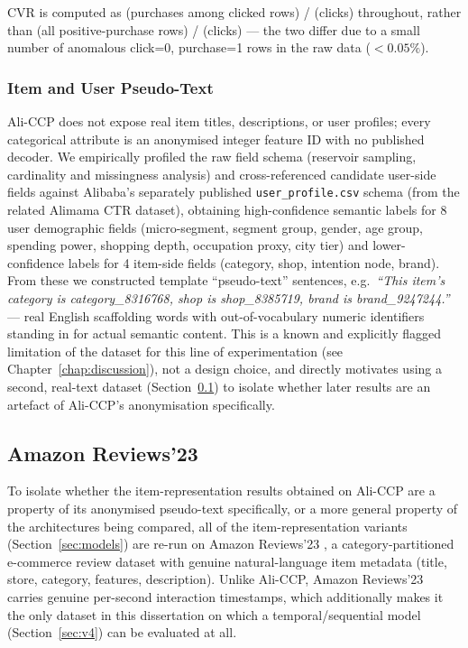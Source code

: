 \documentclass{uclthesis}
\begin{document}
CVR is computed as (purchases among clicked rows) / (clicks) throughout, rather than (all positive-purchase rows) / (clicks) --- the two differ due to a small number of anomalous click=0, purchase=1 rows in the raw data ($<0.05\%$).

\subsubsection{Item and User Pseudo-Text}

Ali-CCP does not expose real item titles, descriptions, or user profiles; every categorical attribute is an anonymised integer feature ID with no published decoder. We empirically profiled the raw field schema (reservoir sampling, cardinality and missingness analysis) and cross-referenced candidate user-side fields against Alibaba's separately published \texttt{user\_profile.csv} schema (from the related Alimama CTR dataset), obtaining high-confidence semantic labels for 8 user demographic fields (micro-segment, segment group, gender, age group, spending power, shopping depth, occupation proxy, city tier) and lower-confidence labels for 4 item-side fields (category, shop, intention node, brand). From these we constructed template ``pseudo-text'' sentences, e.g.\ \textit{``This item's category is category\_8316768, shop is shop\_8385719, brand is brand\_9247244.''} --- real English scaffolding words with out-of-vocabulary numeric identifiers standing in for actual semantic content. This is a known and explicitly flagged limitation of the dataset for this line of experimentation (see Chapter~\ref{chap:discussion}), not a design choice, and directly motivates using a second, real-text dataset (Section~\ref{sec:data-amazon}) to isolate whether later results are an artefact of Ali-CCP's anonymisation specifically.

\subsection{Amazon Reviews'23}
\label{sec:data-amazon}

To isolate whether the item-representation results obtained on Ali-CCP are a property of its anonymised pseudo-text specifically, or a more general property of the architectures being compared, all of the item-representation variants (Section~\ref{sec:models}) are re-run on Amazon Reviews'23 \citep{hou2024bridging}, a category-partitioned e-commerce review dataset with genuine natural-language item metadata (title, store, category, features, description). Unlike Ali-CCP, Amazon Reviews'23 carries genuine per-second interaction timestamps, which additionally makes it the only dataset in this dissertation on which a temporal/sequential model (Section~\ref{sec:v4}) can be evaluated at all.
\end{document}
